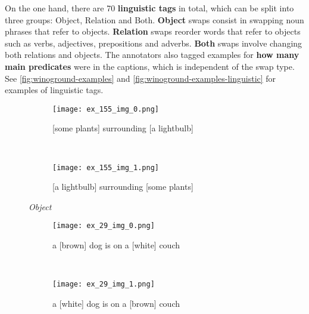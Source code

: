 On the one hand, there are 70 \textbf{linguistic tags} in total, which can be split into three groups: Object, Relation and Both. \textbf{Object} swaps consist in swapping noun phrases that refer to objects. \textbf{Relation} swaps reorder words that refer to objects such as verbs, adjectives, prepositions and adverbs. \textbf{Both} swaps involve changing both relations and objects. The annotators also tagged examples for \textbf{how many main predicates} were in the captions, which is independent of the swap type. See \cref{fig:winoground-examples} and \cref{fig:winoground-examples-linguistic} for examples of linguistic tags.

\begin{figure}[ht]
\centering
    \begin{minipage}[t]{.30\textwidth}
        \begin{subfigure}[t]{\textwidth}
        \centering
        \texttt{[image: ex\_155\_img\_0.png]}
        \caption{[some plants] surrounding [a lightbulb]}
        \end{subfigure}\\
        \begin{subfigure}[t]{\textwidth}
        \centering
        \texttt{[image: ex\_155\_img\_1.png]}
        \caption{[a lightbulb] surrounding [some plants]}
        \end{subfigure}%
        \caption*{\textit{Object}}
    \end{minipage}
    \hfill
    \begin{minipage}[t]{.30\textwidth}
        \begin{subfigure}[t]{\textwidth}
        \centering
        \texttt{[image: ex\_29\_img\_0.png]}
        \caption{a [brown] dog is on a [white] couch}
        \end{subfigure}\\
        \vspace{10pt}
        \begin{subfigure}[t]{\textwidth}
        \centering
        \texttt{[image: ex\_29\_img\_1.png]}
        \caption{a [white] dog is on a [brown] couch}
        \end{subfigure}%
        \vspace{10pt}
        \caption*{\textit{Relation}}
    \end{minipage}
    \hfill
    \begin{minipage}[t]{.30\textwidth}
        \begin{subfigure}[t]{\textwidth}
        \centering

\end{subfigure}
\end{minipage}
\end{figure}
